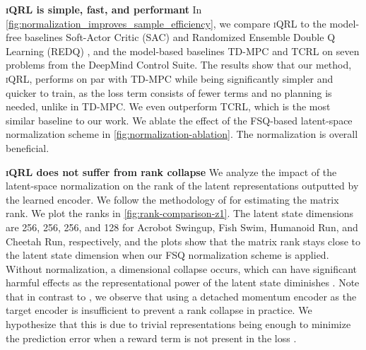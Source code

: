 \documentclass{article}
\theoremstyle{plain}
\theoremstyle{definition}
\theoremstyle{remark}
\newcommand{\our}{\textsc{iQRL}\xspace}
\begin{document}
\textbf{\our is simple, fast, and performant}
In \cref{fig:normalization_improves_sample_efficiency}, we compare \our to the model-free baselines Soft-Actor Critic (SAC) \cite{haarnojaSoft2018} and Randomized Ensemble Double Q Learning (REDQ) \cite{chenRandomizedEnsembledDouble2021}, and the model-based baselines TD-MPC \cite{hansenTemporalDifferenceLearning2022} and TCRL \cite{zhaoSimplifiedTemporalConsistency2023} on seven problems from the DeepMind Control Suite. The results show that our method, \our, performs on par with TD-MPC while being significantly simpler and quicker to train, as the loss term consists of fewer terms and no planning is needed, unlike in TD-MPC. We even outperform TCRL, which is the most similar baseline to our work. We ablate the effect of the FSQ-based latent-space normalization scheme in \cref{fig:normalization-ablation}. The normalization is overall beneficial.

\textbf{\our does not suffer from rank collapse} We analyze the impact of the latent-space normalization on the rank of the latent representations outputted by the learned encoder.
We follow the methodology of \citet{ni2024bridging} for estimating the matrix rank. We plot the ranks in \cref{fig:rank-comparison-z1}. The latent state dimensions are 256, 256, 256, and 128 for Acrobot Swingup, Fish Swim, Humanoid Run, and Cheetah Run, respectively, and the plots show that the matrix rank stays close to the latent state dimension when our FSQ normalization scheme is applied. Without normalization, a dimensional collapse occurs, which can have significant harmful effects as the representational power of the latent state diminishes \cite{jingUnderstandingDimensionalCollapse2021}. Note that in contrast to \citet{ni2024bridging}, we observe that using a detached momentum encoder as the target encoder is insufficient to prevent a rank collapse in practice. We hypothesize that this is due to trivial representations being enough to minimize the prediction error when a reward term is not present in the loss \cite{tang2023understanding}. 
\end{document}

